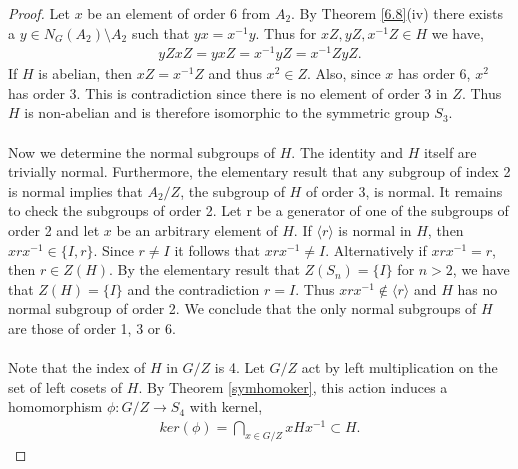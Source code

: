 \begin{proof}
Let $x$ be an element of order 6 from $A_2$. By Theorem \ref{6.8}(iv) there exists a $y \in N_G(A_2) \! \setminus \! A_2$ such that $y x = x^{-1} y$. Thus for $xZ, yZ, x^{-1}Z \in H$ we have,
\begin{align*} yZ xZ = yxZ =  x^{-1}yZ = x^{-1}Z yZ.
\end{align*}
If $H$ is abelian, then $xZ = x^{-1}Z$ and thus $x^2 \in Z$. Also, since $x$ has order 6, $x^2$ has order 3. This is contradiction since there is no element of order 3 in $Z$. Thus $H$ is non-abelian and is therefore isomorphic to the symmetric group $S_3$. \\
\\
Now we determine the normal subgroups of $H$. The identity and $H$ itself are trivially normal. Furthermore, the elementary result that any subgroup of index 2 is normal implies that $A_2 / Z$, the subgroup of $H$ of order 3, is normal. It remains to check the subgroups of order 2. Let r be a generator of one of the subgroups of order 2 and let $x$ be an arbitrary element of $H$. If $\langle r \rangle$ is normal in $H$, then $x r x^{-1} \in \{ I , r \}$. Since $r \neq I$ it follows that $x r x^{-1} \neq I$. Alternatively if $x r x^{-1} = r$, then $r \in Z(H)$. By the elementary result that $Z(S_n) = \{ I \}$ for $n > 2$, we have that $Z(H) = \{ I \}$ and the contradiction $r=I$. Thus $x r x^{-1} \not \in \langle r \rangle$ and $H$ has no normal subgroup of order 2. We conclude that the only normal subgroups of $H$ are those of order 1, 3 or 6. \\
\\
Note that the index of $H$ in $G / Z$ is 4. Let $G / Z$ act by left multiplication on the set of left cosets of $H$. By Theorem \ref{symhomoker}, this action induces a homomorphism $\phi : G / Z \longrightarrow S_4$ with kernel,
\begin{align*} ker(\phi) = \bigcap\limits_{x \in G / Z} x H x^{-1}  \subset H.
\end{align*}


\end{proof}
